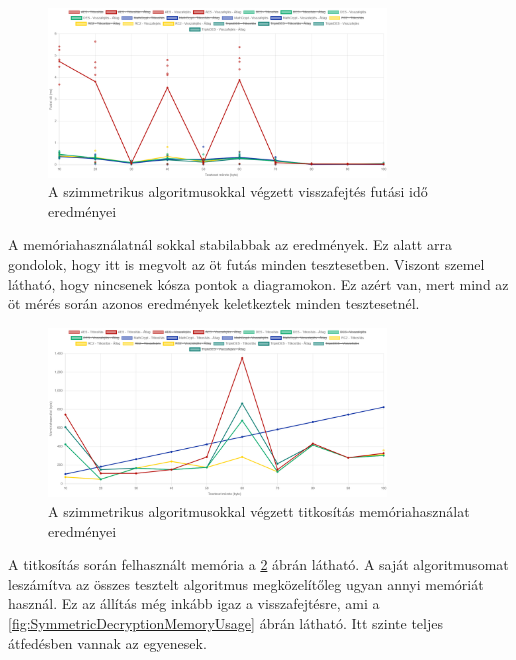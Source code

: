 \documentclass[12pt]{report} %
\begin{document}
\begin{figure}[H]
    \centering %
    \includegraphics[width=0.8\textwidth]{Figures/SymmetricDecryptionRunTime.png} %
    \caption{A szimmetrikus algoritmusokkal végzett visszafejtés futási idő eredményei} %
    \label{fig:SymmetricDecryptionRunTime} %
\end{figure}

A memóriahasználatnál sokkal stabilabbak az eredmények. Ez alatt arra gondolok, hogy itt is megvolt az öt futás minden tesztesetben. Viszont szemel látható, hogy nincsenek kósza pontok a diagramokon. Ez azért van, mert mind az öt mérés során azonos eredmények keletkeztek minden tesztesetnél.

\begin{figure}[H]
    \centering %
    \includegraphics[width=0.8\textwidth]{Figures/SymmetricEncryptionMemoryUsage.png} %
    \caption{A szimmetrikus algoritmusokkal végzett titkosítás memóriahasználat eredményei} %
    \label{fig:SymmetricEncryptionMemoryUsage} %
\end{figure}

A titkosítás során felhasznált memória a \ref{fig:SymmetricEncryptionMemoryUsage} ábrán látható. A saját algoritmusomat leszámítva az összes tesztelt algoritmus megközelítőleg ugyan annyi memóriát használ. Ez az állítás még inkább igaz a visszafejtésre, ami a \ref{fig:SymmetricDecryptionMemoryUsage} ábrán látható. Itt szinte teljes átfedésben vannak az egyenesek.
\end{document}
